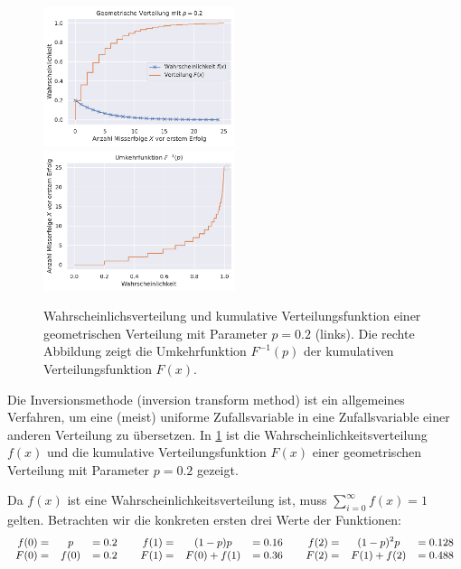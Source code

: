 \begin{figure}[t]
    \begin{center}
        \includegraphics[width=0.5\textwidth]{data/geometric-distr.pdf}%
        \includegraphics[width=0.5\textwidth]{data/geometric-distr-inv.pdf}
    \end{center}

    \caption{
        Wahrscheinlichsverteilung und kumulative Verteilungsfunktion einer geometrischen Verteilung mit Parameter $p = 0.2$ (links).
        Die rechte Abbildung zeigt die \glqq Umkehrfunktion\grqq{} $F^{-1}(p)$ der kumulativen Verteilungsfunktion $F(x)$.
    }
    \label{fig:geometric-distr}
\end{figure}

Die Inversionsmethode (inversion transform method) ist ein allgemeines Verfahren, um eine (meist) uniforme Zufallsvariable in eine Zufallsvariable einer anderen Verteilung zu übersetzen.
In \cref{fig:geometric-distr} ist die Wahrscheinlichkeitsverteilung $f(x)$ und die kumulative Verteilungsfunktion $F(x)$ einer geometrischen Verteilung mit Parameter $p = 0.2$ gezeigt.

Da $f(x)$ ist eine Wahrscheinlichkeitsverteilung ist, muss $\sum_{i=0}^{\infty} f(x) = 1$ gelten.
Betrachten wir die konkreten ersten drei Werte der Funktionen:
\begin{equation*}
    \small
    \begin{array}{rcl c rcl c rcl}
        f(0) = & p          & =0.2   & \hfill &
        f(1) = & (1 - p)p   & =0.16  & \hfill &
        f(2) = & (1 - p)^2p & =0.128            \\

        F(0) = & f(0)       & =0.2   & \hfill &
        F(1) = & F(0)+f(1)  & =0.36  & \hfill &
        F(2) = & F(1)+f(2)  & =0.488
    \end{array}
\end{equation*}

